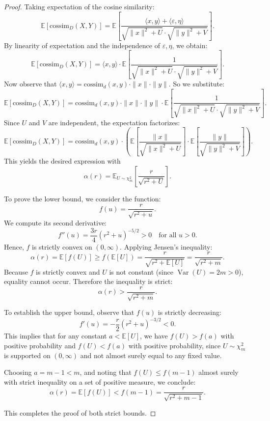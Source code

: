 \documentclass{article}
\theoremstyle{plain}
\theoremstyle{definition}
\theoremstyle{remark}
\begin{document}
\begin{appendices}
\begin{proof}
Taking expectation of the cosine similarity:
\[
\mathbb{E}[\mathrm{cossim}_D(X,Y)] = \mathbb{E} \left[ \frac{\langle x, y \rangle + \langle \varepsilon, \eta \rangle}{\sqrt{\|x\|^2 + U} \cdot \sqrt{\|y\|^2 + V}} \right].
\]
By linearity of expectation and the independence of $\varepsilon, \eta$, we obtain:
\[
\mathbb{E}[\mathrm{cossim}_D(X,Y)] = \langle x, y \rangle \cdot \mathbb{E} \left[ \frac{1}{\sqrt{\|x\|^2 + U} \cdot \sqrt{\|y\|^2 + V}} \right].
\]
Now observe that $\langle x, y \rangle = \mathrm{cossim}_d(x, y) \cdot \|x\| \cdot \|y\|$. So we substitute:
\[
\mathbb{E}[\mathrm{cossim}_D(X,Y)] = \mathrm{cossim}_d(x, y) \cdot \|x\| \cdot \|y\| \cdot \mathbb{E} \left[ \frac{1}{\sqrt{\|x\|^2 + U} \cdot \sqrt{\|y\|^2 + V}} \right].
\]
Since $U$ and $V$ are independent, the expectation factorizes:
\[
\mathbb{E}[\mathrm{cossim}_D(X,Y)] = \mathrm{cossim}_d(x, y) \cdot \left( \mathbb{E} \left[ \frac{\|x\|}{\sqrt{\|x\|^2 + U}} \right] \cdot \mathbb{E} \left[ \frac{\|y\|}{\sqrt{\|y\|^2 + V}} \right] \right).
\]
This yields the desired expression with
\[
\alpha(r) = \mathbb{E}_{U \sim \chi^2_m} \left[ \frac{r}{\sqrt{r^2 + U}} \right].
\]

To prove the lower bound, we consider the function:
\[
f(u) = \frac{r}{\sqrt{r^2 + u}}.
\]
We compute its second derivative:
\[
f''(u) = \frac{3r}{4} (r^2 + u)^{-5/2} > 0 \quad \text{for all } u > 0.
\]
Hence, $f$ is strictly convex on $(0, \infty)$.
Applying Jensen's inequality:
\[
\alpha(r) = \mathbb{E}[f(U)] \ge f(\mathbb{E}[U]) = \frac{r}{\sqrt{r^2 + \mathbb{E}[U]}} = \frac{r}{\sqrt{r^2 + m}}.
\]
Because $f$ is strictly convex and $U$ is not constant (since $\operatorname{Var}(U) = 2m > 0$), equality cannot occur. Therefore the inequality is strict:
\[
\alpha(r) > \frac{r}{\sqrt{r^2 + m}}.
\]

To establish the upper bound, observe that $f(u)$ is strictly decreasing:
\[
f'(u) = -\frac{r}{2}(r^2 + u)^{-3/2} < 0.
\]
This implies that for any constant $a < \mathbb{E}[U]$, we have $f(U) > f(a)$ with positive probability and $f(U) < f(a)$ with positive probability, since $U \sim \chi^2_m$ is supported on $(0, \infty)$ and not almost surely equal to any fixed value.

Choosing $a = m - 1 < m$, and noting that $f(U) \le f(m - 1)$ almost surely with strict inequality on a set of positive measure, we conclude:
\[
\alpha(r) = \mathbb{E}[f(U)] < f(m - 1) = \frac{r}{\sqrt{r^2 + m - 1}}.
\]

This completes the proof of both strict bounds.
\end{proof}


\end{appendices}
\end{document}
